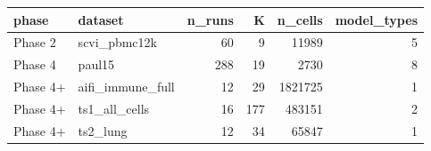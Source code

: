 \begin{tabular}{llrrrr}
\toprule
phase & dataset & n\_runs & K & n\_cells & model\_types \\
\midrule
Phase 2 & scvi\_pbmc12k & 60 & 9 & 11989 & 5 \\
Phase 4 & paul15 & 288 & 19 & 2730 & 8 \\
Phase 4+ & aifi\_immune\_full & 12 & 29 & 1821725 & 1 \\
Phase 4+ & ts1\_all\_cells & 16 & 177 & 483151 & 2 \\
Phase 4+ & ts2\_lung & 12 & 34 & 65847 & 1 \\
\bottomrule
\end{tabular}
